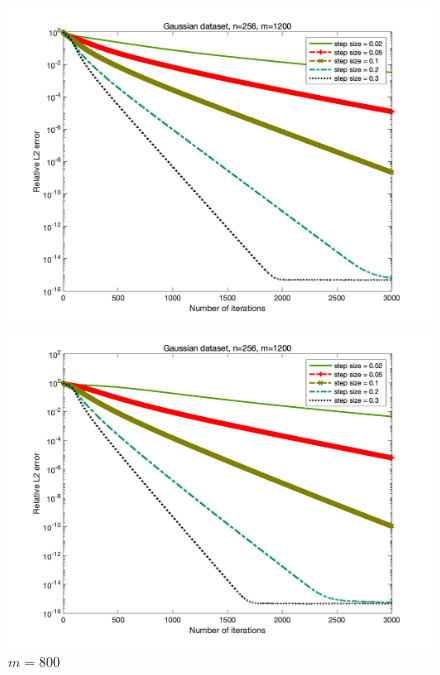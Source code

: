 \documentclass{article}
\begin{document}
	\begin{figure}
		\begin{minipage}{0.33\linewidth}
			\centering
			\includegraphics[width=1\linewidth]{./fig/gaussian+31.png}
			\caption{$m=400$}
		\end{minipage}
		\begin{minipage}{0.33\linewidth}
			\centering
			\includegraphics[width=1\linewidth]{./fig/gaussian+32.png}
			\caption{$m=800$}
		\end{minipage}
		\begin{minipage}{0.33\linewidth}
			\centering

\end{minipage}
\end{figure}
\end{document}
